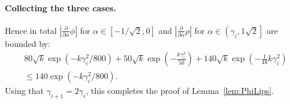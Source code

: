 \paragraph{Collecting the three cases.}
Hence in total $|\frac{\partial}{\partial\alpha}\phi|$ for $\alpha\in [-1/\sqrt{2}, 0]$ and $|\frac{\partial}{\partial\alpha}\rho|$ for $\alpha\in \left(\gamma_i,1\sqrt{2}\right]$ are bounded by:
\begin{align*}
    80\sqrt{k} \exp\left(- k\gamma_i^2/800\right)
    + 50\sqrt{k}\exp\left(-\frac{k\gamma_i^2}{50}\right)
    + 140\sqrt{k}\exp\left(-\frac{1}{48} k\gamma_i^2\right)\\
    \le 140\exp\left(-k\gamma_i^2/800\right).
\end{align*}
Using that $\gamma_{i+1}=2\gamma_i$, this completes the proof of Lemma~\ref{lem:PhiLips}.